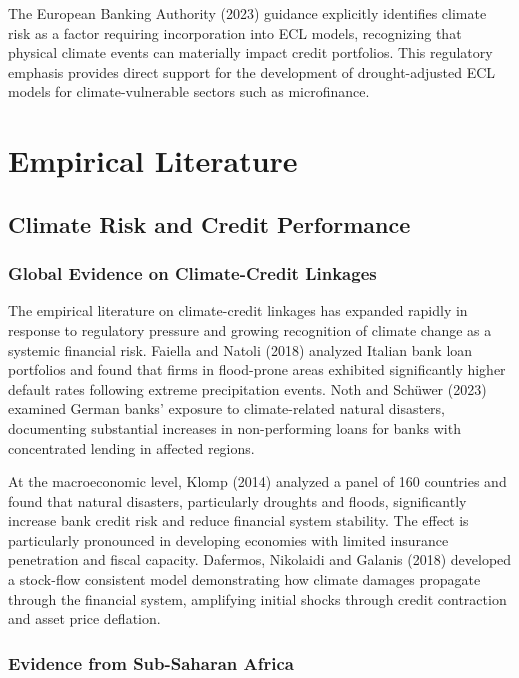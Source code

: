 \documentclass[12pt,a4paper]{article}
\begin{document}
The European Banking Authority (2023) guidance explicitly identifies climate risk as a factor requiring incorporation into ECL models, recognizing that physical climate events can materially impact credit portfolios. This regulatory emphasis provides direct support for the development of drought-adjusted ECL models for climate-vulnerable sectors such as microfinance.

\section{Empirical Literature}

\subsection{Climate Risk and Credit Performance}

\subsubsection{Global Evidence on Climate-Credit Linkages}

The empirical literature on climate-credit linkages has expanded rapidly in response to regulatory pressure and growing recognition of climate change as a systemic financial risk. Faiella and Natoli (2018) analyzed Italian bank loan portfolios and found that firms in flood-prone areas exhibited significantly higher default rates following extreme precipitation events. Noth and Sch\"uwer (2023) examined German banks' exposure to climate-related natural disasters, documenting substantial increases in non-performing loans for banks with concentrated lending in affected regions.

At the macroeconomic level, Klomp (2014) analyzed a panel of 160 countries and found that natural disasters, particularly droughts and floods, significantly increase bank credit risk and reduce financial system stability. The effect is particularly pronounced in developing economies with limited insurance penetration and fiscal capacity. Dafermos, Nikolaidi and Galanis (2018) developed a stock-flow consistent model demonstrating how climate damages propagate through the financial system, amplifying initial shocks through credit contraction and asset price deflation.

\subsubsection{Evidence from Sub-Saharan Africa}
\end{document}
